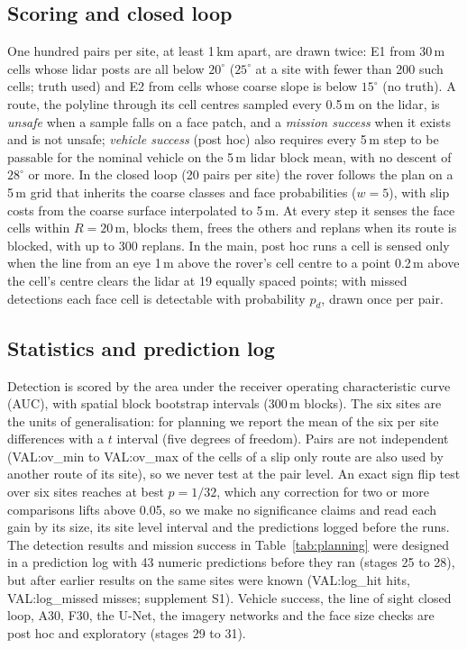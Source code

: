 \subsection{Scoring and closed loop}
One hundred pairs per site, at least 1\,km apart, are drawn twice: E1 from 30\,m cells whose lidar posts are all below $20^\circ$ ($25^\circ$ at a site with fewer than 200 such cells; truth used) and E2 from cells whose coarse slope is below $15^\circ$ (no truth). A route, the polyline through its cell centres sampled every 0.5\,m on the lidar, is \emph{unsafe} when a sample falls on a face patch, and a \emph{mission success} when it exists and is not unsafe; \emph{vehicle success} (post hoc) also requires every 5\,m step to be passable for the nominal vehicle on the 5\,m lidar block mean, with no descent of $28^\circ$ or more. In the closed loop (20 pairs per site) the rover follows the plan on a 5\,m grid that inherits the coarse classes and face probabilities ($w=5$), with slip costs from the coarse surface interpolated to 5\,m. At every step it senses the face cells within $R=20$\,m, blocks them, frees the others and replans when its route is blocked, with up to 300 replans. In the main, post hoc runs a cell is sensed only when the line from an eye 1\,m above the rover's cell centre to a point 0.2\,m above the cell's centre clears the lidar at 19 equally spaced points; with missed detections each face cell is detectable with probability $p_d$, drawn once per pair.

\subsection{Statistics and prediction log}
Detection is scored by the area under the receiver operating characteristic curve (AUC), with spatial block bootstrap intervals (300\,m blocks). The six sites are the units of generalisation: for planning we report the mean of the six per site differences with a $t$ interval (five degrees of freedom). Pairs are not independent ({{VAL:ov_min}} to {{VAL:ov_max}} of the cells of a slip only route are also used by another route of its site), so we never test at the pair level. An exact sign flip test over six sites reaches at best $p=1/32$, which any correction for two or more comparisons lifts above 0.05, so we make no significance claims and read each gain by its size, its site level interval and the predictions logged before the runs. The detection results and mission success in Table~\ref{tab:planning} were designed in a prediction log with 43 numeric predictions before they ran (stages 25 to 28), but after earlier results on the same sites were known ({{VAL:log_hit}} hits, {{VAL:log_missed}} misses; supplement S1). Vehicle success, the line of sight closed loop, A30, F30, the U-Net, the imagery networks and the face size checks are post hoc and exploratory (stages 29 to 31).
